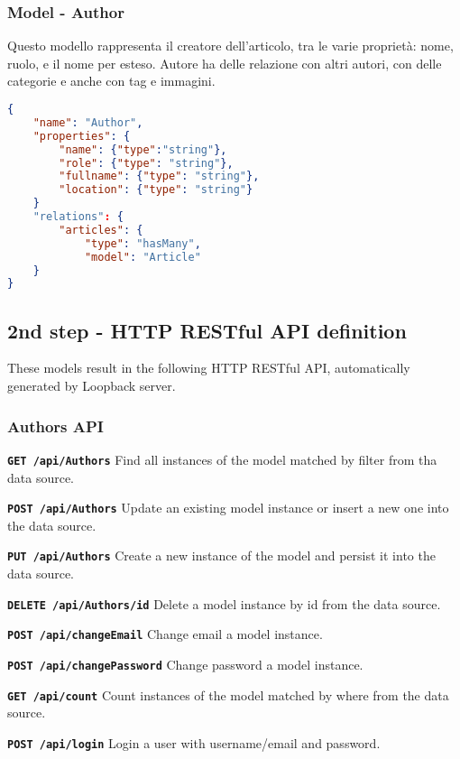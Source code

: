 \subsubsection{Model - Author}

Questo modello rappresenta il creatore dell'articolo, tra le varie proprietà: nome, ruolo, e il nome per esteso.
Autore ha delle relazione con altri autori, con delle categorie e anche con tag e immagini.

\begin{lstlisting}[language=json]
{
	"name": "Author",
	"properties": {
		"name": {"type":"string"},
    	"role": {"type": "string"},
    	"fullname": {"type": "string"},
    	"location": {"type": "string"}
	}
	"relations": {
    	"articles": {
     		"type": "hasMany",
      		"model": "Article"
    }
}
\end{lstlisting}

\subsection{2nd step - HTTP RESTful API definition}

These models result in the following HTTP RESTful API, automatically generated by Loopback server.

\subsubsection{Authors API}

\texttt{\textbf{GET /api/Authors}} Find all instances of the model matched by filter from tha data source.

\texttt{\textbf{POST /api/Authors}} Update an existing model instance or insert a new one into the data source.

\texttt{\textbf{PUT /api/Authors}} Create a new instance of the model and persist it into the data source.

\texttt{\textbf{DELETE /api/Authors/{id}}} Delete a model instance by id from the data source.

\texttt{\textbf{POST /api/changeEmail}} Change email a model instance.

\texttt{\textbf{POST /api/changePassword}} Change password a model instance.

\texttt{\textbf{GET /api/count}} Count instances of the model matched by where from the data source.

\texttt{\textbf{POST /api/login}} Login a user with username/email and password.

